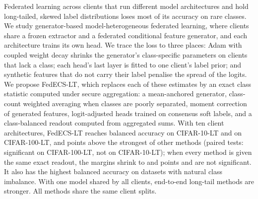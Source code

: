 Federated learning across clients that run different model architectures and hold long-tailed, skewed label
distributions loses most of its accuracy on rare classes. We study generator-based model-heterogeneous federated
learning, where clients share a frozen extractor and a federated conditional feature generator, and each architecture
trains its own head. We trace the loss to three places: Adam with coupled
weight decay shrinks the generator's class-specific parameters on clients that lack a class; each head's last layer
is fitted to one client's label prior; and synthetic features that do not carry their label penalise the spread of
the logits. We propose FedECS-LT, which replaces each of these estimates by an exact class statistic computed
under secure aggregation: a mean-anchored generator, class-count weighted averaging when classes are poorly
separated, moment correction of generated features, logit-adjusted heads trained on consensus soft labels, and a
class-balanced readout computed from aggregated sums. With ten client architectures, FedECS-LT reaches
 balanced accuracy on CIFAR-10-LT and  on CIFAR-100-LT,
 and  points above the strongest of  other methods
(paired tests: significant on CIFAR-100-LT, not on CIFAR-10-LT); when every method is given the same exact readout,
the margins shrink to  and  points and are not significant. It also has the highest balanced accuracy on 
datasets with natural class imbalance. With one model shared by all clients, end-to-end long-tail
methods are stronger. All methods share the same client splits.
